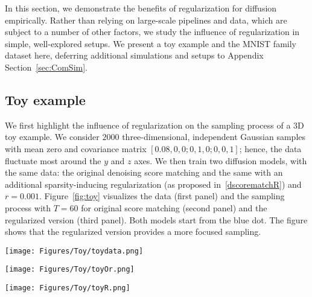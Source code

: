 In this section, 
we demonstrate the  benefits of regularization for diffusion empirically.
Rather than relying on large-scale pipelines and data,
which are subject to a number of other factors,
we study the influence of regularization in simple, well-explored setups. 
We present a toy example and the MNIST family dataset here, deferring additional simulations and setups to Appendix Section~\ref{sec:ComSim}.


\subsection{Toy example}
We first highlight the influence of regularization on the sampling process of a 3D toy example. 
We consider $2000$ three-dimensional, independent Gaussian samples with mean zero and covariance matrix $\allowbreak[0.08,0,0;0,1,0;0,0,1]$;
hence, the data fluctuate most around the $y$ and $z$ axes.
We then train two diffusion models, with the same data: 
the original denoising score matching and the same with an additional sparsity-inducing regularization (as proposed in~\eqref{dscorematchR}) and $r=0.001$.
Figure~\ref{fig:toy} visualizes the data (first panel) and the sampling process with $T=60$ for original score matching (second panel) and the regularized version (third panel).
Both models start from the blue dot. 
The figure shows that the regularized version provides a more focused sampling. %

\begin{figure*}[htbp]
    \begin{minipage}{0.27\textwidth}
        \centering
        \texttt{[image: Figures/Toy/toydata.png]}
    \end{minipage}
       \hfill
    \begin{minipage}{0.27\textwidth}
        \centering
        \texttt{[image: Figures/Toy/toyOr.png]}
    \end{minipage}
    \hfill
    \begin{minipage}{0.27\textwidth}
        \centering
        \texttt{[image: Figures/Toy/toyR.png]}
    \end{minipage}

    \caption{Visualizing the sampling process for 3D data (first panel) with original denoising score matching (second panel) versus regularized denoising score matching (third panel).
The original samples are depicted as red circles, blue circles indicate the starting points for sampling, and green circles represent the latent generated samples.
The red arrows illustrate the sampling paths. It is evident that regularized denoising score matching predominantly adheres to the two-dimensional sub-manifold (along the $Y$ and $Z$ axes), whereas the original denoising score matching explores the entire 3D space.
    }\label{fig:toy}
\end{figure*}

